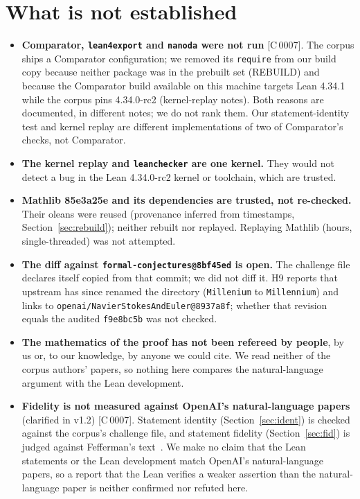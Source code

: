 \documentclass[10pt]{article}
\newcommand{\tg}[2]{\texorpdfstring{\textsf{[#1\,#2]}}{}}  %
\newcommand{\lean}[1]{\texttt{#1}}
\renewcommand{\_}{\textunderscore\allowbreak}
\begin{document}
\section{What is not established}\label{sec:not}
\begin{itemize}
\item \textbf{Comparator, \texttt{lean4export} and \texttt{nanoda} were not run} \tg{C}{0007}. The corpus ships a Comparator configuration; we removed its \lean{require} from our build copy because neither package was in the prebuilt set (REBUILD) and because the Comparator build available on this machine targets Lean 4.34.1 while the corpus pins 4.34.0-rc2 (kernel-replay notes). Both reasons are documented, in different notes; we do not rank them.
Our statement-identity test and kernel replay are different implementations of two of Comparator's checks, not Comparator.
\item \textbf{The kernel replay and \texttt{leanchecker} are one kernel.} They would not detect a bug in the Lean 4.34.0-rc2 kernel or toolchain, which are trusted.
\item \textbf{Mathlib 85e3a25e and its dependencies are trusted, not re-checked.} Their oleans were reused (provenance inferred from timestamps, Section~\ref{sec:rebuild}); neither rebuilt nor replayed. Replaying Mathlib (hours, single-threaded) was not attempted.
\item \textbf{The diff against \texttt{formal-conjectures@8bf45ed} is open.} The challenge file declares itself copied from that commit; we did not diff it. H9 reports that upstream has since renamed the directory (\texttt{Millenium} to \texttt{Millennium}) and links to \texttt{openai/NavierStokesAndEuler@8937a8f}; whether that revision equals the audited \texttt{f9e8bc5b} was not checked.
\item \textbf{The mathematics of the proof has not been refereed by people}, by us or, to our knowledge, by anyone we could cite. We read neither of the corpus authors' papers, so nothing here compares the natural-language argument with the Lean development.
\item \textbf{Fidelity is not measured against OpenAI's natural-language papers} (clarified in v1.2) \tg{C}{0007}. Statement identity (Section~\ref{sec:ident}) is checked against the corpus's challenge file, and statement fidelity (Section~\ref{sec:fid}) is judged against Fefferman's text~\cite{fef}. We make no claim that the Lean statements or the Lean development match OpenAI's natural-language papers, so a report that the Lean verifies a weaker assertion than the natural-language paper is neither confirmed nor refuted here.

\end{itemize}
\end{document}
